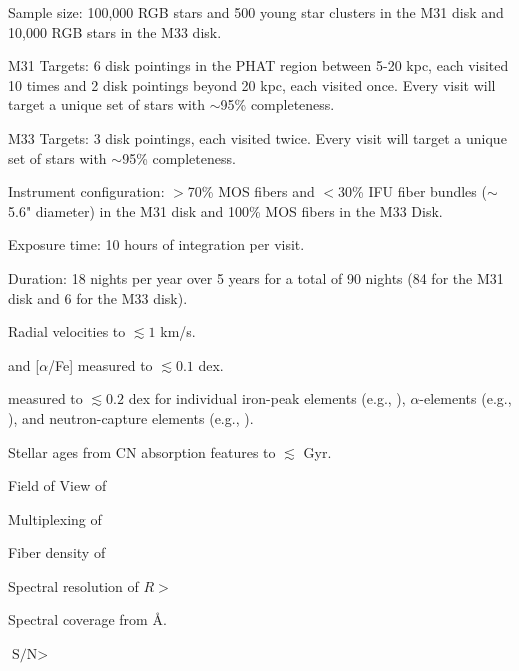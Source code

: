 \documentclass[11pt,a4paper,twoside,onecolumn,openany,final,oldfontcommands]{memoir}
\begin{document}
\begin{programrequirement}

\reqitem Sample size: 100,000 RGB stars and 500 young star clusters in the M31 disk and 10,000 RGB stars in the M33 disk.

\reqitem M31 Targets: 6 disk pointings in the PHAT region between 5-20 kpc, each visited 10 times and 2 disk pointings beyond 20 kpc, each visited once. Every visit will target a unique set of stars with $\sim$95\% completeness.

\reqitem M33 Targets: 3 disk pointings, each visited twice. Every visit will target a unique set of stars with $\sim$95\% completeness.

\reqitem Instrument configuration: $>$70\% MOS fibers and $<$30\% IFU fiber bundles ($\sim$5.6" diameter) in the M31 disk and 100\% MOS fibers in the M33 Disk.

\reqitem Exposure time: 10 hours of integration per visit.

\reqitem Duration: 18 nights per year over 5 years for a total of 90 nights (84 for the M31 disk and 6 for the M33 disk).

\end{programrequirement}

\begin{sciencerequirement}

\reqitem Radial velocities to $\lesssim 1$ km/s.

\reqitem[] [Fe/H] and [$\alpha$/Fe] measured to $\lesssim 0.1$ dex.

\reqitem[] [X/Fe] measured to $\lesssim 0.2$ dex for individual iron-peak elements (e.g., ), $\alpha$-elements (e.g., ), and neutron-capture elements (e.g., ).

\reqitem Stellar ages from CN absorption features to $\lesssim$  Gyr.

\end{sciencerequirement}

\begin{requirement}

\reqitem Field of View of 

\reqitem Multiplexing of 

\reqitem Fiber density of 

\reqitem Spectral resolution of $R>$ 

\reqitem Spectral coverage from  \AA.

\reqitem $\text{S/N}>$ 

\end{requirement}
\end{document}
